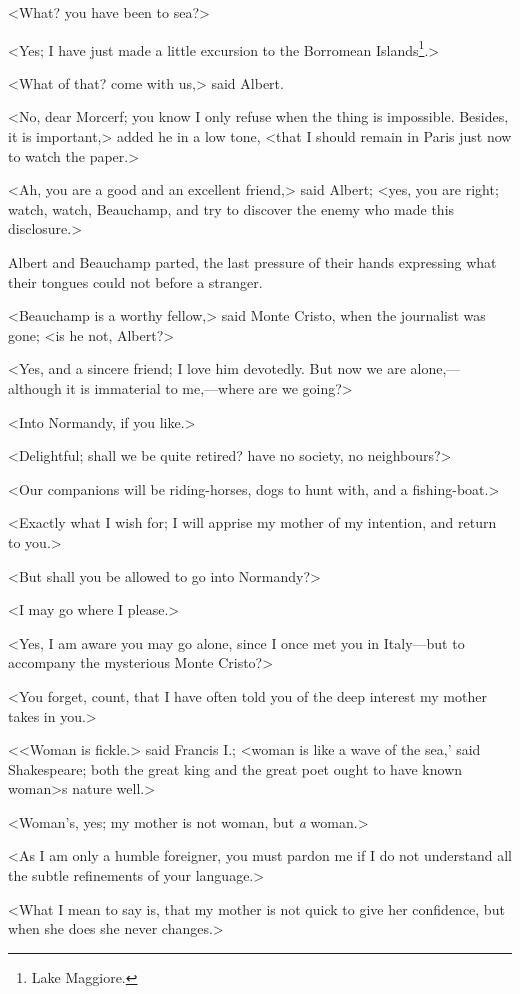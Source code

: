  <What? you have been to sea?> 

 <Yes; I have just made a little excursion to the Borromean Islands\footnote{Lake Maggiore. }.> 

 <What of that? come with us,> said Albert. 

 <No, dear Morcerf; you know I only refuse when the thing is impossible. Besides, it is important,> added he in a low tone, <that I should remain in Paris just now to watch the paper.> 

 <Ah, you are a good and an excellent friend,> said Albert; <yes, you are right; watch, watch, Beauchamp, and try to discover the enemy who made this disclosure.> 

 Albert and Beauchamp parted, the last pressure of their hands expressing what their tongues could not before a stranger. 

 <Beauchamp is a worthy fellow,> said Monte Cristo, when the journalist was gone; <is he not, Albert?> 

 <Yes, and a sincere friend; I love him devotedly. But now we are alone,—although it is immaterial to me,—where are we going?> 

 <Into Normandy, if you like.> 

 <Delightful; shall we be quite retired? have no society, no neighbours?> 

 <Our companions will be riding-horses, dogs to hunt with, and a fishing-boat.> 

 <Exactly what I wish for; I will apprise my mother of my intention, and return to you.> 

 <But shall you be allowed to go into Normandy?> 

 <I may go where I please.> 

 <Yes, I am aware you may go alone, since I once met you in Italy—but to accompany the mysterious Monte Cristo?> 

 <You forget, count, that I have often told you of the deep interest my mother takes in you.> 

 <<Woman is fickle.> said Francis I.; <woman is like a wave of the sea,' said Shakespeare; both the great king and the great poet ought to have known woman>s nature well.> 

 <Woman's, yes; my mother is not woman, but \textit{a} woman.> 

 <As I am only a humble foreigner, you must pardon me if I do not understand all the subtle refinements of your language.> 

 <What I mean to say is, that my mother is not quick to give her confidence, but when she does she never changes.> 

